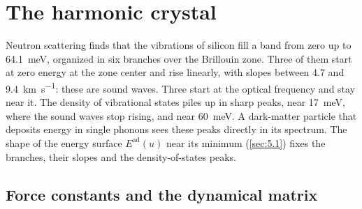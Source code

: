 \section{The harmonic crystal}\label{sec:5.2}

Neutron scattering finds that the vibrations of silicon fill a band from zero up to \SI{64.1}{meV}, organized in six branches over the Brillouin zone. Three of them start at zero energy at the zone center and rise linearly, with slopes between 4.7 and \SI{9.4}{km.s^{-1}}: these are sound waves. Three start at the optical frequency and stay near it. The density of vibrational states piles up in sharp peaks, near \SI{17}{meV}, where the sound waves stop rising, and near \SI{60}{meV}. A dark-matter particle that deposits energy in single phonons sees these peaks directly in its spectrum. The shape of the energy surface $E^{\mathrm{ad}}(u)$ near its minimum (\cref{sec:5.1}) fixes the branches, their slopes and the density-of-states peaks.

\subsection{Force constants and the dynamical matrix}

